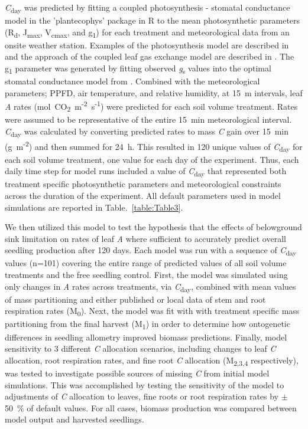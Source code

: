 \documentclass[a4paper]{article}\usepackage[]{graphicx}\usepackage[]{color}
\begin{document}
\textit{C}\textsubscript{day} was predicted by fitting a coupled photosynthesis - stomatal conductance model \citep{farquhar1980biochemical,medlyn2011reconciling} in the 'plantecophys' package in R \citep{Duursma2014} to the mean photosynthetic parameters (R\textsubscript{d}, J\textsubscript{max}, V\textsubscript{cmax}, and g\textsubscript{1}) for each treatment and meteorological data from an onsite weather station.  Examples of the photosynthesis model are described in \citet{medlyn2002temperature} and the approach of the coupled leaf gas exchange model are described in \citet{duursma2014peaked}. The g\textsubscript{1} parameter was generated by fitting observed \textit{g}\textsubscript{s} values into the optimal stomatal conductance model from \citep{medlyn2012reconciling}. Combined with the meteorological parameters; PPFD, air temperature, and relative humidity, at 15~m intervals, leaf \textit{A} rates ({\textmugreek}mol~CO\textsubscript{2}~m\textsuperscript{-2}~s\textsuperscript{-1}) were predicted for each soil volume treatment. Rates were assumed to be representative of the entire 15~min meteorological interval. \textit{C}\textsubscript{day} was calculated by converting predicted rates to mass \textit{C} gain over 15~min (g~m\textsuperscript{-2}) and then summed for 24~h. This resulted in 120 unique values of \textit{C}\textsubscript{day} for each soil volume treatment, one value for each day of the experiment. Thus, each daily time step for model runs included a value of \textit{C}\textsubscript{day} that represented both treatment specific photosynthetic parameters and meteorological constraints across the duration of the experiment. All default parameters used in model simulations are reported in Table.~\ref{table:Table3}.

We then utilized this model to test the hypothesis that the effects of belowground sink limitation on rates of leaf \textit{A} where sufficient to accurately predict overall seedling production after 120 days. Each model was run with a sequence of \textit{C}\textsubscript{day}  values (n=101) covering the entire range of predicted values of all soil volume treatments and the free seedling control. First, the model was simulated using only changes in \textit{A} rates across treatments, via \textit{C}\textsubscript{day}, combined with mean values of mass partitioning and either published or local data of stem and root respiration rates (M\textsubscript{0}). Next, the model was fit with with treatment specific mass partitioning from the final harvest (M\textsubscript{1}) in order to determine how ontogenetic differences in seedling allometry improved biomass predictions. Finally, model sensitivity to 3 different \textit{C} allocation scenarios, including changes to leaf \textit{C} allocation, root respiration rates, and fine root \textit{C} allocation (M\textsubscript{2,3,4} respectively), was tested to investigate possible sources of missing \textit{C} from initial model simulations. This was accomplished by testing the sensitivity of the model to adjustments of \textit{C} allocation to leaves, fine roots or root respiration rates by $\pm$50~\% of default values. For all cases, biomass production was compared between model output and harvested seedlings. 
\end{document}
